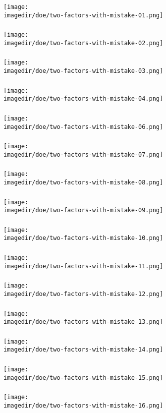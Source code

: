 \begin{frame}\frametitle{}
	\centerline{\texttt{[image: \\imagedir/doe/two-factors-with-mistake-01.png]}}
\end{frame}
\begin{frame}\frametitle{}
	\centerline{\texttt{[image: \\imagedir/doe/two-factors-with-mistake-02.png]}}
\end{frame}
\begin{frame}\frametitle{}
	\centerline{\texttt{[image: \\imagedir/doe/two-factors-with-mistake-03.png]}}
\end{frame}
\begin{frame}\frametitle{}
	\centerline{\texttt{[image: \\imagedir/doe/two-factors-with-mistake-04.png]}}
\end{frame}
\begin{frame}\frametitle{}
	\centerline{\texttt{[image: \\imagedir/doe/two-factors-with-mistake-06.png]}}
\end{frame}
\begin{frame}\frametitle{}
	\centerline{\texttt{[image: \\imagedir/doe/two-factors-with-mistake-07.png]}}
\end{frame}
\begin{frame}\frametitle{}
	\centerline{\texttt{[image: \\imagedir/doe/two-factors-with-mistake-08.png]}}
\end{frame}
\begin{frame}\frametitle{}
	\centerline{\texttt{[image: \\imagedir/doe/two-factors-with-mistake-09.png]}}
\end{frame}
\begin{frame}\frametitle{}
	\centerline{\texttt{[image: \\imagedir/doe/two-factors-with-mistake-10.png]}}
\end{frame}
\begin{frame}\frametitle{}
	\centerline{\texttt{[image: \\imagedir/doe/two-factors-with-mistake-11.png]}}
\end{frame}
\begin{frame}\frametitle{}
	\centerline{\texttt{[image: \\imagedir/doe/two-factors-with-mistake-12.png]}}
\end{frame}
\begin{frame}\frametitle{}
	\centerline{\texttt{[image: \\imagedir/doe/two-factors-with-mistake-13.png]}}
\end{frame}
\begin{frame}\frametitle{}
	\centerline{\texttt{[image: \\imagedir/doe/two-factors-with-mistake-14.png]}}
\end{frame}
\begin{frame}\frametitle{}
	\centerline{\texttt{[image: \\imagedir/doe/two-factors-with-mistake-15.png]}}
\end{frame}
\begin{frame}\frametitle{}
	\centerline{\texttt{[image: \\imagedir/doe/two-factors-with-mistake-16.png]}}
\end{frame}

